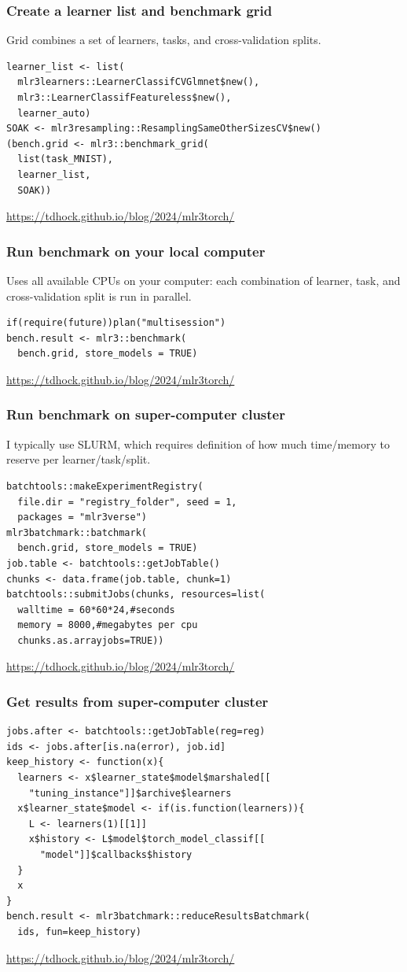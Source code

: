 \documentclass{beamer}
\begin{document}
\begin{frame}[fragile]
  \frametitle{Create a learner list and benchmark grid}
  Grid combines a set of learners, tasks, and cross-validation splits.
\begin{verbatim}
learner_list <- list(
  mlr3learners::LearnerClassifCVGlmnet$new(),
  mlr3::LearnerClassifFeatureless$new(),
  learner_auto)
SOAK <- mlr3resampling::ResamplingSameOtherSizesCV$new()
(bench.grid <- mlr3::benchmark_grid(
  list(task_MNIST),
  learner_list,
  SOAK))
\end{verbatim}
  \url{https://tdhock.github.io/blog/2024/mlr3torch/}
\end{frame}

\begin{frame}[fragile]
  \frametitle{Run benchmark on your local computer} Uses all available
  CPUs on your computer: each combination of learner, task, and
  cross-validation split is run in parallel.
\begin{verbatim}
if(require(future))plan("multisession")
bench.result <- mlr3::benchmark(
  bench.grid, store_models = TRUE)
\end{verbatim}
  \url{https://tdhock.github.io/blog/2024/mlr3torch/}
\end{frame}

\begin{frame}[fragile]
  \frametitle{Run benchmark on super-computer cluster} I typically use
  SLURM, which requires definition of how much time/memory to reserve
  per learner/task/split.
\begin{verbatim}
batchtools::makeExperimentRegistry(
  file.dir = "registry_folder", seed = 1,
  packages = "mlr3verse")
mlr3batchmark::batchmark(
  bench.grid, store_models = TRUE)
job.table <- batchtools::getJobTable()
chunks <- data.frame(job.table, chunk=1)
batchtools::submitJobs(chunks, resources=list(
  walltime = 60*60*24,#seconds
  memory = 8000,#megabytes per cpu
  chunks.as.arrayjobs=TRUE))
\end{verbatim}
  \url{https://tdhock.github.io/blog/2024/mlr3torch/}
\end{frame}

\begin{frame}[fragile]
  \frametitle{Get results from super-computer cluster}
\begin{verbatim}
jobs.after <- batchtools::getJobTable(reg=reg)
ids <- jobs.after[is.na(error), job.id]
keep_history <- function(x){
  learners <- x$learner_state$model$marshaled[[
    "tuning_instance"]]$archive$learners
  x$learner_state$model <- if(is.function(learners)){
    L <- learners(1)[[1]]
    x$history <- L$model$torch_model_classif[[
      "model"]]$callbacks$history
  }
  x
}
bench.result <- mlr3batchmark::reduceResultsBatchmark(
  ids, fun=keep_history)
\end{verbatim}
  \url{https://tdhock.github.io/blog/2024/mlr3torch/}
\end{frame}
\end{document}
